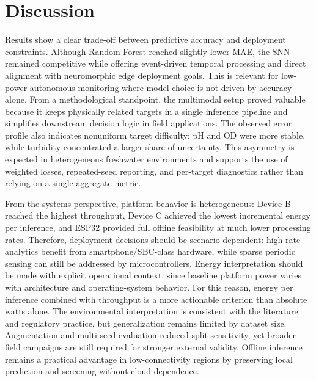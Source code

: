 \section{Discussion}

Results show a clear trade-off between predictive accuracy and deployment constraints. Although Random Forest reached slightly lower MAE, the SNN remained competitive while offering event-driven temporal processing and direct alignment with neuromorphic edge deployment goals. This is relevant for low-power autonomous monitoring where model choice is not driven by accuracy alone. From a methodological standpoint, the multimodal setup proved valuable because it keeps physically related targets in a single inference pipeline and simplifies downstream decision logic in field applications. The observed error profile also indicates nonuniform target difficulty: pH and OD were more stable, while turbidity concentrated a larger share of uncertainty. This asymmetry is expected in heterogeneous freshwater environments and supports the use of weighted losses, repeated-seed reporting, and per-target diagnostics rather than relying on a single aggregate metric.

From the systems perspective, platform behavior is heterogeneous: Device B reached the highest throughput, Device C achieved the lowest incremental energy per inference, and ESP32 provided full offline feasibility at much lower processing rates. Therefore, deployment decisions should be scenario-dependent: high-rate analytics benefit from smartphone/SBC-class hardware, while sparse periodic sensing can still be addressed by microcontrollers. Energy interpretation should be made with explicit operational context, since baseline platform power varies with architecture and operating-system behavior. For this reason, energy per inference combined with throughput is a more actionable criterion than absolute watts alone. The environmental interpretation is consistent with the literature and regulatory practice, but generalization remains limited by dataset size. Augmentation and multi-seed evaluation reduced split sensitivity, yet broader field campaigns are still required for stronger external validity. Offline inference remains a practical advantage in low-connectivity regions by preserving local prediction and screening without cloud dependence.
